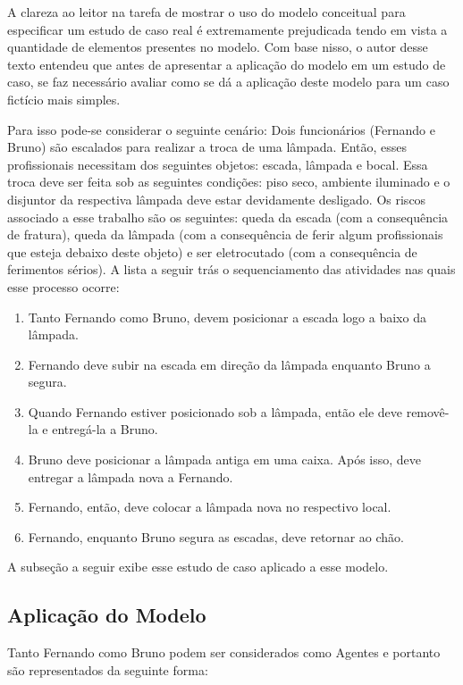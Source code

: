 A clareza ao leitor na tarefa de mostrar o uso do modelo conceitual para especificar um estudo de caso real é extremamente prejudicada tendo em vista a quantidade de elementos presentes no modelo. Com base nisso, o autor desse texto entendeu que antes de apresentar a aplicação do modelo em um estudo de caso, se faz necessário avaliar como se dá a aplicação deste modelo para um caso fictício mais simples. 

Para isso pode-se considerar o seguinte cenário: Dois funcionários (Fernando e Bruno) são escalados para realizar a troca de uma lâmpada. Então, esses profissionais necessitam dos seguintes objetos: escada, lâmpada e bocal. Essa troca deve ser feita sob as seguintes condições: piso seco, ambiente iluminado e o disjuntor da respectiva lâmpada deve estar devidamente desligado. Os riscos associado a esse trabalho são os seguintes: queda da escada (com a consequência de fratura), queda da lâmpada (com a consequência de ferir algum profissionais que esteja debaixo deste objeto) e ser eletrocutado (com a consequência de ferimentos sérios). A lista a seguir trás o sequenciamento das atividades nas quais esse processo ocorre:

\begin{enumerate}
	\item Tanto Fernando como Bruno, devem posicionar a escada logo a baixo da lâmpada. 
	\item Fernando deve subir na escada em direção da lâmpada enquanto Bruno a segura. 
	\item Quando Fernando estiver posicionado sob a lâmpada, então ele deve removê-la e entregá-la a Bruno. 
	\item Bruno deve posicionar a lâmpada antiga em uma caixa. Após isso, deve entregar a lâmpada nova a Fernando.
	\item Fernando, então, deve colocar a lâmpada nova no respectivo local. 
	\item Fernando, enquanto Bruno segura as escadas, deve retornar ao chão. 
\end{enumerate}

A subseção a seguir exibe esse estudo de caso aplicado a esse modelo. 

\subsection{Aplicação do Modelo}

Tanto Fernando como Bruno podem ser considerados como Agentes e portanto são representados da seguinte forma:

